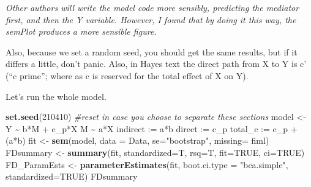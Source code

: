 \documentclass[
  11pt,
]{book}
\newenvironment{Shaded}{\begin{snugshade}}{\end{snugshade}}
\newcommand{\AttributeTok}[1]{\textcolor[rgb]{0.27,0.27,0.27}{#1}}
\newcommand{\CommentTok}[1]{\textcolor[rgb]{0.37,0.37,0.37}{\textit{#1}}}
\newcommand{\ConstantTok}[1]{\textcolor[rgb]{0.37,0.37,0.37}{#1}}
\newcommand{\DecValTok}[1]{\textcolor[rgb]{0.06,0.06,0.06}{#1}}
\newcommand{\FunctionTok}[1]{\textcolor[rgb]{0.27,0.27,0.27}{\textbf{#1}}}
\newcommand{\NormalTok}[1]{#1}
\newcommand{\OtherTok}[1]{\textcolor[rgb]{0.37,0.37,0.37}{#1}}
\newcommand{\StringTok}[1]{\textcolor[rgb]{0.5,0.5,0.5}{#1}}
\begin{document}
\emph{Other authors will write the model code more sensibly, predicting the mediator first, and then the Y variable. However, I found that by doing it this way, the semPlot produces a more sensible figure.}

Also, because we set a random seed, you should get the same results, but if it differs a little, don't panic. Also, in Hayes text the direct path from X to Y is c' (``c prime''; where as c is reserved for the total effect of X on Y).

Let's run the whole model.

\begin{Shaded}
\begin{Highlighting}[]
\FunctionTok{set.seed}\NormalTok{(}\DecValTok{210410}\NormalTok{) }\CommentTok{\#reset in case you choose to separate these sections}
\NormalTok{model }\OtherTok{\textless{}{-}} \StringTok{\textquotesingle{}}
\StringTok{          Y \textasciitilde{} b*M + c\_p*X }
\StringTok{          M \textasciitilde{} a*X}
\StringTok{          }
\StringTok{          indirect :=  a*b}
\StringTok{          direct  := c\_p}
\StringTok{          total\_c  := c\_p + (a*b)}
\StringTok{          \textquotesingle{}}
\NormalTok{fit }\OtherTok{\textless{}{-}} \FunctionTok{sem}\NormalTok{(model, }\AttributeTok{data =}\NormalTok{ Data, }\AttributeTok{se=}\StringTok{"bootstrap"}\NormalTok{, }\AttributeTok{missing=} \StringTok{\textquotesingle{}fiml\textquotesingle{}}\NormalTok{)}
\NormalTok{FDsummary }\OtherTok{\textless{}{-}} \FunctionTok{summary}\NormalTok{(fit, }\AttributeTok{standardized=}\NormalTok{T, }\AttributeTok{rsq=}\NormalTok{T, }\AttributeTok{fit=}\ConstantTok{TRUE}\NormalTok{, }\AttributeTok{ci=}\ConstantTok{TRUE}\NormalTok{)}
\NormalTok{FD\_ParamEsts }\OtherTok{\textless{}{-}} \FunctionTok{parameterEstimates}\NormalTok{(fit, }\AttributeTok{boot.ci.type =} \StringTok{"bca.simple"}\NormalTok{, }\AttributeTok{standardized=}\ConstantTok{TRUE}\NormalTok{)}
\NormalTok{FDsummary}
\end{Highlighting}
\end{Shaded}
\end{document}
